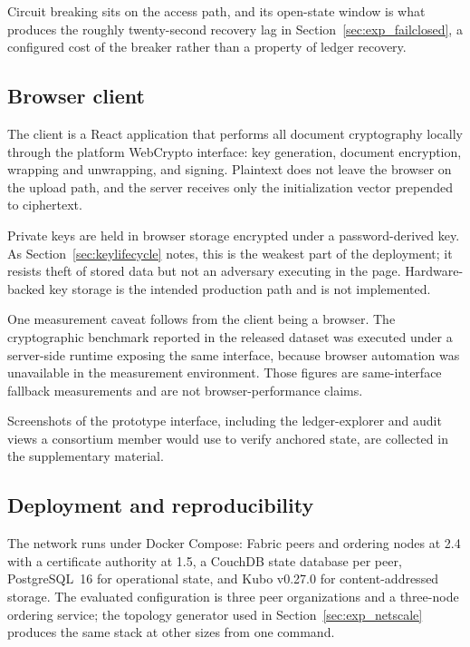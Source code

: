 \documentclass[preprint,12pt]{elsarticle}
\begin{document}
Circuit breaking sits on the access path, and its open-state window is what
produces the roughly twenty-second recovery lag in
Section~\ref{sec:exp_failclosed}, a configured cost of the breaker rather
than a property of ledger recovery.

\subsection{Browser client}
\label{sec:client}

The client is a React application that performs all document cryptography
locally through the platform WebCrypto interface: key generation, document
encryption, wrapping and unwrapping, and signing. Plaintext does not leave the
browser on the upload path, and the server receives only the initialization
vector prepended to ciphertext.

Private keys are held in browser storage encrypted under a password-derived
key. As Section~\ref{sec:keylifecycle} notes, this is the weakest part of the
deployment; it resists theft of stored data but not an adversary executing in
the page. Hardware-backed key storage is the intended production path and is
not implemented.

One measurement caveat follows from the client being a browser. The
cryptographic benchmark reported in the released dataset was executed under a
server-side runtime exposing the same interface, because browser automation was
unavailable in the measurement environment. Those figures are same-interface
fallback measurements and are not browser-performance claims.

Screenshots of the prototype interface, including the ledger-explorer and
audit views a consortium member would use to verify anchored state, are
collected in the supplementary material.

\subsection{Deployment and reproducibility}
\label{sec:deployment}

The network runs under Docker Compose: Fabric peers and ordering nodes at 2.4
with a certificate authority at 1.5, a CouchDB state database per peer,
PostgreSQL~16 for operational state, and Kubo v0.27.0 for content-addressed
storage. The evaluated configuration is three peer organizations and a
three-node ordering service; the topology generator used in
Section~\ref{sec:exp_netscale} produces the same stack at other sizes from one
command.
\end{document}

